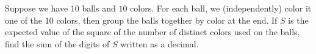 Suppose we have $10$ balls and $10$ colors. For each ball, we (independently) color it one of the $10$ colors, then group the balls together by color at the end. If $S$ is the expected value of the square of the number of distinct colors used on the balls, find the sum of the digits of $S$ written as a decimal.
